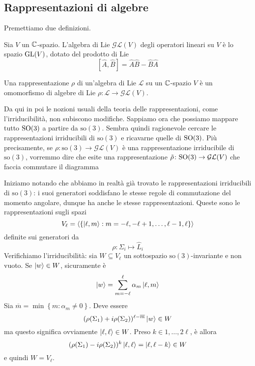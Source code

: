 \documentclass[a4paper, 11pt]{article}
\newcommand{\op}{\hat}
\renewcommand{\L}{\mathcal{L}}
\newcommand{\1}{\mathbbm{1}}
\renewcommand{\l}{\ell}
\begin{document}
	\subsection{Rappresentazioni di algebre}
	Premettiamo due definizioni.
	\begin{definition}
		Sia $V$ un $\mathbb{C}$-spazio. L'algebra di Lie $\mathcal{GL}(V)$ degli operatori lineari su $V$ è lo spazio $\mathrm{GL}(V)$, dotato del prodotto di Lie
		\[[\op A,\op B]=\op A\op B-\op B\op A\]
	\end{definition}
	\begin{definition}
		Una rappresentazione $\rho$ di un'algebra di Lie $\mathcal{L}$ su un $\mathbb{C}$-spazio $V$ è un omomorfismo di algebre di Lie $\rho\colon\L\to\mathcal{GL}(V)$.
	\end{definition}
	Da qui in poi le nozioni usuali della teoria delle rappresentazioni, come l'irriducibilità, non subiscono modifiche. Sappiamo ora che possiamo mappare tutto $\mathrm{SO}(3)$ a partire da $\mathrm{so}(3)$. Sembra quindi ragionevole cercare le rappresentazioni irriducibili di $\mathrm{so}(3)$ e ricavarne quelle di $\mathrm{SO}(3)$. Più precisamente, se $\rho\colon\mathrm{so}(3)\to\mathcal{GL}(V)$ è una rappresentazione irriducibile di $\mathrm{so}(3)$, vorremmo dire che esite una rappresentazione $\tilde{\rho}\colon\mathrm{SO}(3)\to\mathcal{GL}(V)$ che faccia commutare il diagramma
	\begin{figure}[h!]
		\centering
\end{figure}


	Iniziamo notando che abbiamo in realtà già trovato le rappresentazioni irriducibili di $\mathrm{so}(3)$: i suoi generatori soddisfano le stesse regole di commutazione del momento angolare, dunque ha anche le stesse rappresentazioni. Queste sono le rappresentazioni sugli spazi
	\[V_\l=\langle\left\{\ket{\l,m}:m=-\l,-\l+1,\dots,\l-1,\l\right\}\rangle\]
	definite sui generatori da
	\[\rho\colon\Sigma_i\mapsto\op L_i\]
	Verifichiamo l'irriducibilità: sia $W\subseteq V_\l$ un sottospazio $\mathrm{so}(3)$-invariante e non vuoto. Se $\left| w\right\rangle\in W$, sicuramente è
	\[\ket{w}=\sum_{m=-\l}^{\l}\alpha_m\ket{\l,m}\]
	Sia $\overline{m}=\min\left\{m:\alpha_m\neq0\right\}$. Deve essere
	\[(\rho(\Sigma_1)+i\rho(\Sigma_2))^{\l-\overline{m}}\ket{w}\in W\]
	ma questo significa ovviamente $\ket{\l,\l}\in W$. Preso $k\in1,\dots,2\l$, è allora
	\[(\rho(\Sigma_1)-i\rho(\Sigma_2))^k\ket{\l,\l}=\ket{\l,\l-k}\in W\]
	e quindi $W=V_\l$.
	
\end{document}
